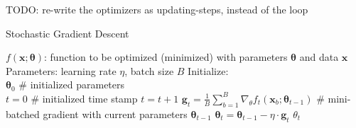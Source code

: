 TODO: {\color{red}
re-write the optimizers as updating-steps, instead of the loop
}


\begin{algorithm}[H]
  \caption{Stochastic Gradient Descent}
  \begin{algorithmic}[1]\label{algo:optimizer-sgd}
    \Require $f \left(\mathbf{x}; \boldsymbol\theta\right)$:
    function to be optimized (minimized) with parameters $\boldsymbol\theta$ and data $\mathbf{x}$
    \Require Parameters: learning rate $\eta$, batch size $B$
    \Require Initialize: \\
    $\boldsymbol\theta_0$ \# initialized parameters\\
    $t = 0$ \# initialized time stamp
    \State $t = t + 1$
    \State $\mathbf{g}_t = \frac1B \sum_{b=1}^B \nabla_\theta f_t(\mathbf{x}_b; \boldsymbol\theta_{t-1})$
    \# mini-batched gradient with current parameters $\boldsymbol\theta_{t-1}$
    \State $\boldsymbol\theta_t = \boldsymbol\theta_{t-1} - \eta\cdot \mathbf{g}_t$
    \EndWhile
    \Ensure $\theta_t$
  \end{algorithmic}
\end{algorithm}

